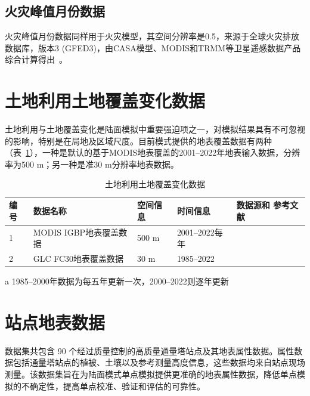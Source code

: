 \subsection{火灾峰值月份数据}\label{火灾峰值月份数据}
火灾峰值月份数据同样用于火灾模型，其空间分辨率是0.5\textdegree，来源于全球火灾排放数据库，版本3 (GFED3)，由CASA模型、MODIS和TRMM等卫星遥感数据产品综合计算得出~\citep{van2010global}。


\section{土地利用土地覆盖变化数据}

土地利用与土地覆盖变化是陆面模拟中重要强迫项之一，对模拟结果具有不可忽视的影响，特别是在局地及区域尺度。目前模式提供的地表覆盖数据有两种（表~\ref{tab:LULCC数据}），一种是默认的基于MODIS地表覆盖的2001--2022年地表输入数据，分辨率为500 m；另一种是准30 m分辨率地表数据。

\begin{table}[htbp]
  \begin{threeparttable}
    \centering
    \caption{土地利用土地覆盖变化数据}
    \label{tab:LULCC数据}
    \begin{tabular}{p{1cm}p{4.5cm}p{2cm}p{3cm}p{3cm}}
      \toprule
      编号 & 数据名称               & 空间信息 & 时间信息            & 数据源和 \newline 参考文献 \\
      \midrule
      1    & MODIS IGBP地表覆盖数据 & 500 m    & 2001--2022每年      & \cite{Friedl2019}          \\
      2    & GLC FC30地表覆盖数据   & 30 m     & 1985--2022\tnote{a} & \cite{zhang2023glc_fcs30d} \\
      \bottomrule
    \end{tabular}
    \begin{tablenotes}
    \item [a] 1985--2000年数据为每五年更新一次，2000--2022则逐年更新
    \end{tablenotes}
  \end{threeparttable}
\end{table}


\section{站点地表数据}

数据集共包含 90 个经过质量控制的高质量通量塔站点及其地表属性数据。属性数据包括通量塔站点的植被、土壤以及参考测量高度信息，这些数据均来自站点现场测量。该数据集旨在为陆面模式单点模拟提供更准确的地表属性数据，降低单点模拟的不确定性，提高单点校准、验证和评估的可靠性。

